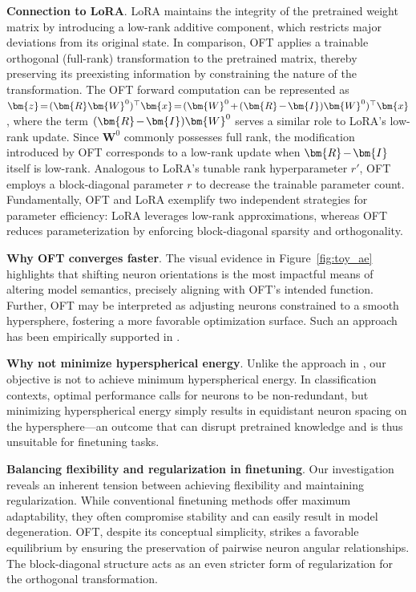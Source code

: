 \textbf{Connection to LoRA}. LoRA maintains the integrity of the pretrained weight matrix by introducing a low-rank additive component, which restricts major deviations from its original state. In comparison, OFT applies a trainable orthogonal (full-rank) transformation to the pretrained matrix, thereby preserving its preexisting information by constraining the nature of the transformation. The OFT forward computation can be represented as $\thickmuskip=2mu \medmuskip=2mu \bm{z}=(\bm{R}\bm{W}^0)^\top\bm{x}=(\bm{W}^0+(\bm{R}-\bm{I})\bm{W}^0)^\top\bm{x}$, where the term $\thickmuskip=2mu \medmuskip=2mu (\bm{R}-\bm{I})\bm{W}^0$ serves a similar role to LoRA’s low-rank update. Since $\bm{W}^0$ commonly possesses full rank, the modification introduced by OFT corresponds to a low-rank update when $\thickmuskip=2mu \medmuskip=2mu \bm{R}-\bm{I}$ itself is low-rank. Analogous to LoRA’s tunable rank hyperparameter $r'$, OFT employs a block-diagonal parameter $r$ to decrease the trainable parameter count. Fundamentally, OFT and LoRA exemplify two independent strategies for parameter efficiency: LoRA leverages low-rank approximations, whereas OFT reduces parameterization by enforcing block-diagonal sparsity and orthogonality.

\textbf{Why OFT converges faster}. The visual evidence in Figure~\ref{fig:toy_ae} highlights that shifting neuron orientations is the most impactful means of altering model semantics, precisely aligning with OFT’s intended function. Further, OFT may be interpreted as adjusting neurons constrained to a smooth hypersphere, fostering a more favorable optimization surface. Such an approach has been empirically supported in \cite{liu2021orthogonal}.

\textbf{Why not minimize hyperspherical energy}. Unlike the approach in \cite{liu2021orthogonal}, our objective is not to achieve minimum hyperspherical energy. In classification contexts, optimal performance calls for neurons to be non-redundant, but minimizing hyperspherical energy simply results in equidistant neuron spacing on the hypersphere—an outcome that can disrupt pretrained knowledge and is thus unsuitable for finetuning tasks.

\textbf{Balancing flexibility and regularization in finetuning}. Our investigation reveals an inherent tension between achieving flexibility and maintaining regularization. While conventional finetuning methods offer maximum adaptability, they often compromise stability and can easily result in model degeneration. OFT, despite its conceptual simplicity, strikes a favorable equilibrium by ensuring the preservation of pairwise neuron angular relationships. The block-diagonal structure acts as an even stricter form of regularization for the orthogonal transformation.

